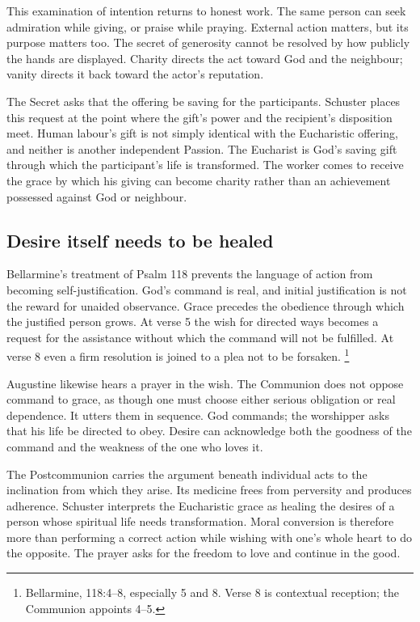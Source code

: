 This examination of intention returns to honest
work. The same person can seek admiration while
giving, or praise while praying. External action
matters, but its purpose matters too. The secret
of generosity cannot be resolved by how publicly
the hands are displayed. Charity directs the act
toward God and the neighbour; vanity directs it
back toward the actor's reputation.

The Secret asks that the offering be saving for
the participants. Schuster places this request
at the point where the gift's power and the
recipient's disposition meet. Human labour's
gift is not simply identical with the Eucharistic
offering, and neither is another independent
Passion. The Eucharist is God's saving gift
through which the participant's life is
transformed. The worker comes to receive
the grace by which his giving can become
charity rather than an achievement possessed
against God or neighbour.

\subsection{Desire itself needs to be healed}

Bellarmine's treatment of Psalm 118 prevents
the language of action from becoming
self-justification. God's command is real,
and initial justification is not the reward
for unaided observance. Grace precedes the
obedience through which the justified person
grows. At verse 5 the wish for directed
ways becomes a request for the assistance
without which the command will not be
fulfilled. At verse 8 even a firm resolution
is joined to a plea not to be forsaken.
\footnote{Bellarmine,  118:4--8,
especially 5 and 8. Verse 8 is contextual
reception; the Communion appoints 4--5.}

Augustine likewise hears a prayer in the
wish. The Communion does not oppose command
to grace, as though one must choose either
serious obligation or real dependence. It
utters them in sequence. God commands;
the worshipper asks that his life be
directed to obey. Desire can acknowledge
both the goodness of the command and the
weakness of the one who loves it.

The Postcommunion carries the argument
beneath individual acts to the inclination
from which they arise. Its medicine frees
from perversity and produces adherence.
Schuster interprets the Eucharistic grace
as healing the desires of a person whose
spiritual life needs transformation.
Moral conversion is therefore more than
performing a correct action while wishing
with one's whole heart to do the opposite.
The prayer asks for the freedom to love
and continue in the good.

